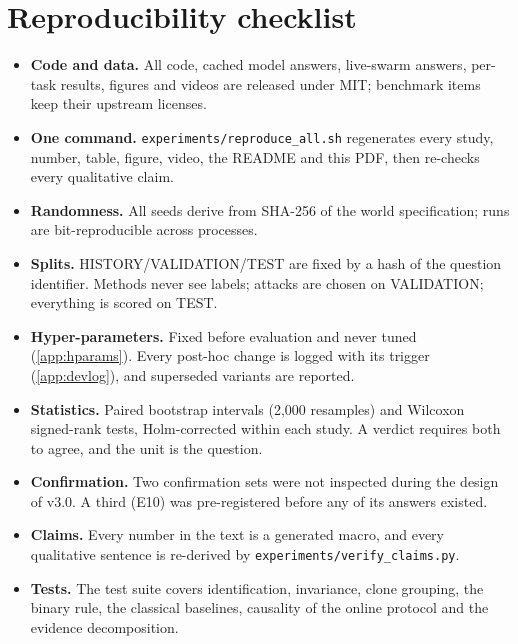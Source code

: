 \section{Reproducibility checklist}\label{app:checklist}
\begin{itemize}[leftmargin=*,itemsep=1pt]
\item \textbf{Code and data.} All code, cached model answers, live-swarm answers, per-task results, figures and videos are released under MIT; benchmark items keep their upstream licenses.
\item \textbf{One command.} \texttt{experiments/reproduce\_all.sh} regenerates every study, number, table, figure, video, the README and this PDF, then re-checks every qualitative claim.
\item \textbf{Randomness.} All seeds derive from SHA-256 of the world specification; runs are bit-reproducible across processes.
\item \textbf{Splits.} HISTORY/\allowbreak VALIDATION/\allowbreak TEST are fixed by a hash of the question identifier. Methods never see labels; attacks are chosen on VALIDATION; everything is scored on TEST.
\item \textbf{Hyper-parameters.} Fixed before evaluation and never tuned (\cref{app:hparams}). Every post-hoc change is logged with its trigger (\cref{app:devlog}), and superseded variants are reported.
\item \textbf{Statistics.} Paired bootstrap intervals (2{,}000 resamples) and Wilcoxon signed-rank tests, Holm-corrected within each study. A verdict requires both to agree, and the unit is the question.
\item \textbf{Confirmation.} Two confirmation sets were not inspected during the design of v3.0. A third (E10) was pre-registered before any of its answers existed.
\item \textbf{Claims.} Every number in the text is a generated macro, and every qualitative sentence is re-derived by \texttt{experiments/verify\_claims.py}.
\item \textbf{Tests.} The test suite covers identification, invariance, clone grouping, the binary rule, the classical baselines, causality of the online protocol and the evidence decomposition.
\end{itemize}

